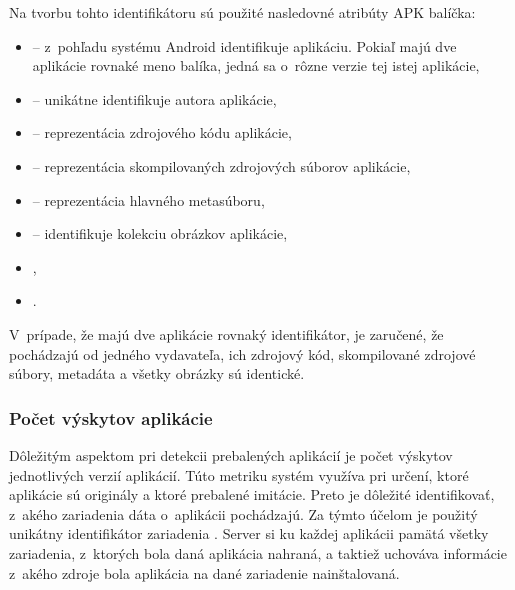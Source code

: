 \noindent Na tvorbu tohto identifikátoru sú použité nasledovné atribúty APK balíčka: 
\begin{itemize}
	\item {} -- z~pohľadu systému Android identifikuje aplikáciu. Pokiaľ majú dve aplikácie rovnaké meno balíka, jedná sa o~rôzne verzie tej istej aplikácie,
	\item {} -- unikátne identifikuje autora aplikácie,
	\item {} -- reprezentácia zdrojového kódu aplikácie,
	\item {} -- reprezentácia skompilovaných zdrojových súborov aplikácie,
	\item {} -- reprezentácia hlavného metasúboru,
	\item {} -- identifikuje kolekciu obrázkov aplikácie,
	\item {},
	\item {}.
\end{itemize}
V~prípade, že majú dve aplikácie rovnaký identifikátor, je zaručené, že pochádzajú od jedného vydavateľa, ich zdrojový kód, skompilované zdrojové súbory, metadáta a všetky  obrázky sú identické. 

\subsubsection{\textbf{Počet výskytov aplikácie}}
Dôležitým aspektom pri detekcii prebalených aplikácií je počet výskytov jednotlivých verzií aplikácií. Túto metriku systém využíva pri určení, ktoré aplikácie sú originály a ktoré prebalené imitácie. Preto je dôležité identifikovať, z~akého zariadenia dáta o~aplikácii pochádzajú. Za týmto účelom je použitý unikátny identifikátor zariadenia . Server si ku každej aplikácii pamätá všetky zariadenia, z~ktorých bola daná aplikácia nahraná, a taktiež uchováva informácie z~akého zdroje bola aplikácia na dané zariadenie nainštalovaná.


